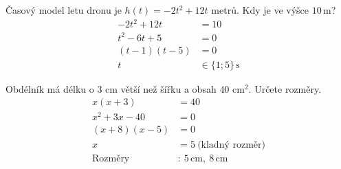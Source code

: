 \documentclass[11pt,a4paper]{article}
\begin{document}
\begin{zadaniReseniBox}[title={Samostatná práce 2}]
Časový model letu dronu je $h(t)=-2t^2+12t$ metrů. Kdy je ve výšce $10\,\mathrm m$?
\tcblower
\[
\begin{aligned}
-2t^2+12t&=10\\[2pt]
t^2-6t+5&=0\\[2pt]
(t-1)(t-5)&=0\\[2pt]
t&\in\{1;5\}\,\mathrm s
\end{aligned}
\]
\end{zadaniReseniBox}
\begin{zadaniReseniBox}[title={Rozšíření 1}]
Obdélník má délku o $3$ cm větší než šířku a obsah $40$ cm$^2$. Určete rozměry.
\tcblower
\[\begin{aligned}
x(x+3)&=40\\x^2+3x-40&=0\\(x+8)(x-5)&=0\\x&=5\ \text{(kladný rozměr)}\\\text{Rozměry}&:\ 5\,\mathrm{cm},\ 8\,\mathrm{cm}
\end{aligned}\]
\end{zadaniReseniBox}
\end{document}
